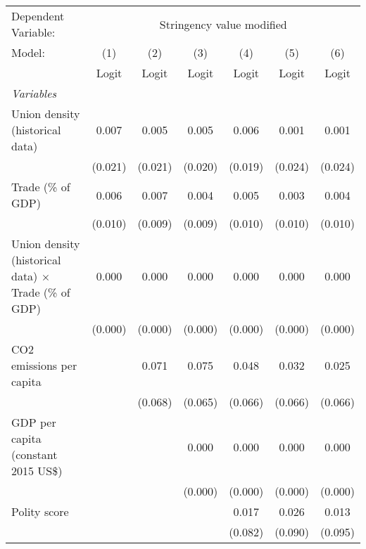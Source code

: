 
\begingroup
\centering
\begin{tabular}{lcccccc}
   \toprule
   Dependent Variable: & \multicolumn{6}{c}{Stringency value modified}\\
   Model:                                                       & (1)     & (2)     & (3)     & (4)     & (5)     & (6)\\  
                                                                &  Logit  & Logit   & Logit   & Logit   & Logit   & Logit\\  
   \midrule
   \emph{Variables}\\
   Union density (historical data)                              & 0.007   & 0.005   & 0.005   & 0.006   & 0.001   & 0.001\\   
                                                                & (0.021) & (0.021) & (0.020) & (0.019) & (0.024) & (0.024)\\   
   Trade (\% of GDP)                                            & 0.006   & 0.007   & 0.004   & 0.005   & 0.003   & 0.004\\   
                                                                & (0.010) & (0.009) & (0.009) & (0.010) & (0.010) & (0.010)\\   
   Union density (historical data) $\times$ Trade (\% of GDP)   & 0.000   & 0.000   & 0.000   & 0.000   & 0.000   & 0.000\\   
                                                                & (0.000) & (0.000) & (0.000) & (0.000) & (0.000) & (0.000)\\   
   CO2 emissions per capita                                     &         & 0.071   & 0.075   & 0.048   & 0.032   & 0.025\\   
                                                                &         & (0.068) & (0.065) & (0.066) & (0.066) & (0.066)\\   
   GDP per capita (constant 2015 US\$)                          &         &         & 0.000   & 0.000   & 0.000   & 0.000\\   
                                                                &         &         & (0.000) & (0.000) & (0.000) & (0.000)\\   
   Polity score                                                 &         &         &         & 0.017   & 0.026   & 0.013\\   
                                                                &         &         &         & (0.082) & (0.090) & (0.095)\\   

\end{tabular}
